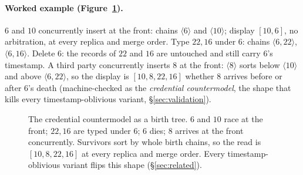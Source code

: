 \documentclass[11pt]{article}
\begin{document}
\paragraph{Worked example (Figure~\ref{fig:credential}).} $6$ and
$10$ concurrently insert at the
front: chains $\langle 6 \rangle$ and $\langle 10 \rangle$;
display $[10, 6]$, no arbitration, at every replica and merge order.
Type $22, 16$ under $6$: chains $\langle 6, 22 \rangle$,
$\langle 6, 16 \rangle$. Delete $6$: the records of $22$ and $16$ are
untouched and still carry $6$'s timestamp. A third party concurrently
inserts $8$ at the front: $\langle 8 \rangle$ sorts below
$\langle 10 \rangle$ and above $\langle 6, 22 \rangle$, so the display
is $[10, 8, 22, 16]$ whether $8$ arrives before or after $6$'s death
(machine-checked as the \emph{credential countermodel}, the shape that
kills every timestamp-oblivious variant, \S\ref{sec:validation}).

\begin{figure}[h]
\centering
{}
\caption{The credential countermodel as a birth tree. $6$ and $10$
race at the front; $22, 16$ are typed under $6$; $6$ dies; $8$
arrives at the front concurrently. Survivors sort by whole birth
chains, so the read is $[10,8,22,16]$ at every replica and merge
order. Every timestamp-oblivious variant flips this shape
(\S\ref{sec:related}).}
\label{fig:credential}
\end{figure}
\end{document}
